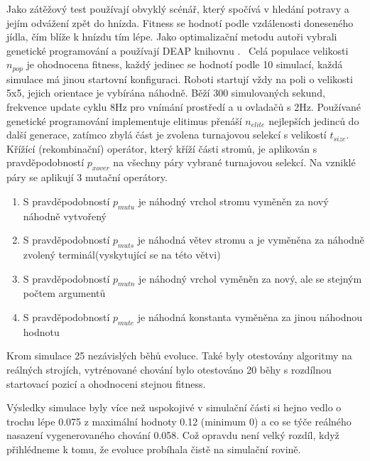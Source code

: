 Jako zátěžový test používají obvyklý scénář, který spočívá v hledání potravy a jejím odvážení zpět do hnízda. Fitness se hodnotí podle vzdálenosti doneseného jídla, čím blíže k hnízdu tím lépe. Jako optimalizační metodu autoři vybrali genetické programování a používají DEAP knihovnu \citep{deap}. \
Celá populace velikosti $n_{pop}$ je ohodnocena fitness, každý jedinec se hodnotí podle 10 simulací, každá simulace má jinou startovní konfiguraci. Roboti startují vždy na poli o velikosti 5x5, jejich orientace je vybírána náhodně. Běží 300 simulovaných sekund, frekvence update cyklu 8Hz pro vnímání prostředí a u ovladačů s 2Hz. Používané genetické programování implementuje elitimus přenáší $n_{elite}$ nejlepších jedinců do další generace, zatímco zbylá část je zvolena  turnajovou selekcí s velikostí $t_{size}$. Křížící (rekombinační) operátor, který kříží části stromů, je aplikován s pravděpodobností $p_{xover}$ na všechny páry vybrané turnajovou selekcí. Na vzniklé páry se aplikují 3 mutační operátory. \par
\begin{enumerate}
    \item S pravděpodobností $p_{mutu}$ je náhodný vrchol stromu vyměněn za nový náhodně vytvořený 
    \item S pravděpodobností $p_{muts}$ je náhodná větev stromu a je  vyměněna za náhodně zvolený terminál(vyskytující se na této větvi)
    \item S pravděpodobností $p_{mutn}$ je náhodný vrchol vyměněn za nový, ale se stejným počtem argumentů
    \item S pravděpodobností $p_{mute}$ je náhodná konstanta vyměněna za jinou náhodnou hodnotu
\end{enumerate}
Krom simulace 25 nezávislých běhů evoluce. Také byly otestovány algoritmy na reálných strojích, vytrénované chování bylo otestováno 20 běhy s rozdílnou startovací pozicí a ohodnoceni stejnou fitness. 
\par
Výsledky simulace byly více než uspokojivé v simulační části si hejno vedlo o trochu lépe 0.075 z maximální hodnoty 0.12 (minimum 0) a co se týče reálného nasazení vygenerovaného chování 0.058. Což opravdu není velký rozdíl, když přihlédneme k tomu, že evoluce probíhala čistě na simulační rovině.

